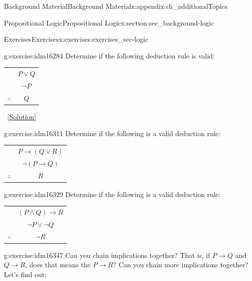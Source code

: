 \documentclass[oneside,10pt,]{book}
\numberwithin{equation}{chapter}
\newcommand{\hrulethin}  {\noalign{\hrule height 0.04em}}
\def\imp{\rightarrow}
\begin{document}
\begin{appendixptx}{Background Material}{}{Background Material}{}{}{x:appendix:ch_additionalTopics}
\begin{sectionptx}{Propositional Logic}{}{Propositional Logic}{}{}{x:section:sec_background-logic}
\begin{exercises-subsection}{Exercises}{}{Exercises}{}{}{x:exercises:exercises_sec-logic}
\begin{divisionexercise}{10}{}{}{g:exercise:idm16284}%
Determine if the following deduction rule is valid:%
\begin{sidebyside}{1}{0}{0}{0}%
\begin{sbspanel}{1}%
{\centering%
\begin{tabular}{cc}
&\(P \vee Q\)\tabularnewline[0pt]
&\(\neg P\)\tabularnewline\hrulethin
\(\therefore\)&\(Q\)
\end{tabular}
\par}
\end{sbspanel}%
\end{sidebyside}%
\qquad~\hfill{\tiny\hyperlink{g:solution:idm16302-main}{[Solution]}}\end{divisionexercise}%
\begin{divisionexercise}{11}{}{}{g:exercise:idm16311}%
Determine if the following is a valid deduction rule:%
\begin{sidebyside}{1}{0}{0}{0}%
\begin{sbspanel}{1}%
{\centering%
\begin{tabular}{cc}
&\(P \imp (Q \vee R)\)\tabularnewline[0pt]
&\(\neg(P \imp Q)\)\tabularnewline\hrulethin
\(\therefore\)&\(R\)
\end{tabular}
\par}
\end{sbspanel}%
\end{sidebyside}%
\end{divisionexercise}%
\begin{divisionexercise}{12}{}{}{g:exercise:idm16329}%
Determine if the following is a valid deduction rule:%
\begin{sidebyside}{1}{0}{0}{0}%
\begin{sbspanel}{1}%
{\centering%
\begin{tabular}{cc}
&\((P \wedge Q) \imp R\)\tabularnewline[0pt]
&\(\neg P \vee \neg Q\)\tabularnewline\hrulethin
\(\therefore\)&\(\neg R\)
\end{tabular}
\par}
\end{sbspanel}%
\end{sidebyside}%
\end{divisionexercise}%
\begin{divisionexercise}{13}{}{}{g:exercise:idm16347}%
Can you chain implications together? That is, if \(P \imp Q\) and \(Q \imp R\), does that means the \(P \imp R\)? Can you chain more implications together? Let's find out:%
\par

\end{divisionexercise}
\end{exercises-subsection}
\end{sectionptx}
\end{appendixptx}
\end{document}
